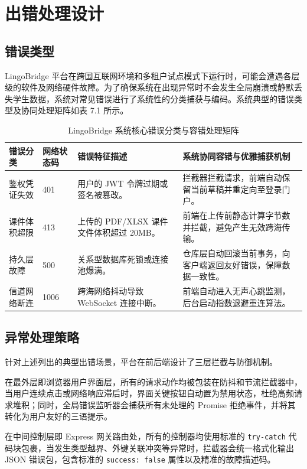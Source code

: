 \chapter{出错处理设计}

\section{错误类型}
LingoBridge 平台在跨国互联网环境和多租户试点模式下运行时，可能会遭遇各层级的软件及网络硬件故障。为了确保系统在出现异常时不会发生全局崩溃或静默丢失学生数据，系统对常见错误进行了系统性的分类捕获与编码。系统典型的错误类型及协同处理矩阵如表 7.1 所示。

\begin{table}[H]
\centering
\caption{LingoBridge 系统核心错误分类与容错处理矩阵}
\label{tab:err_matrix}
\begin{tabularx}{\textwidth}{l p{2.2cm} p{3.2cm} X}
\toprule
\textbf{错误分类} & \textbf{网络状态码} & \textbf{错误特征描述} & \textbf{系统协同容错与优雅捕获机制} \\
\midrule
鉴权凭证失效 & 401 & 用户的 JWT 令牌过期或签名被篡改。 & 拦截器拦截请求，前端自动保留当前草稿并重定向至登录门户。 \\
课件体积超限 & 413 & 上传的 PDF/XLSX 课件文件体积超过 20MB。 & 前端在上传前静态计算字节数并拦截，避免产生无效跨海传输。 \\
持久层故障 & 500 & 关系型数据库死锁或连接池爆满。 & 仓库层自动回滚当前事务，向客户端返回友好错误，保障数据一致性。 \\
信道网络断连 & 1006 & 跨海网络抖动导致 WebSocket 连接中断。 & 前端自动进入无声心跳监测，后台启动指数退避重连算法。 \\
\bottomrule
\end{tabularx}
\end{table}

\section{异常处理策略}
针对上述列出的典型出错场景，平台在前后端设计了三层拦截与防御机制。

在最外层即浏览器用户界面层，所有的请求动作均被包装在防抖和节流拦截器中，当用户连续点击或网络响应滞后时，界面关键按钮自动置为禁用状态，杜绝高频请求堆积；同时，全局错误监听器会捕获所有未处理的 Promise 拒绝事件，并将其转化为用户友好的三语提示。

在中间控制层即 Express 网关路由处，所有的控制器均使用标准的 \texttt{try-catch} 代码块包裹，当发生类型越界、外键关联冲突等异常时，拦截器会统一格式化输出 JSON 错误包，包含标准的 \texttt{success: false} 属性以及精准的故障描述码。

